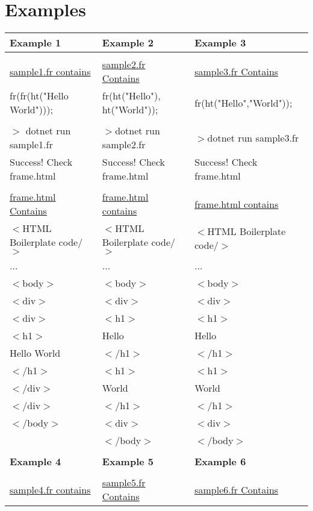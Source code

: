 \documentclass{article}
\newcommand\q[1][.7cm]{\hspace*{#1}}
\begin{document}
\section{Examples}
\begin{center}
\begin{tabular}{l|l|l} 

\textbf{Example 1} & \textbf{Example 2} & \textbf{Example 3}\\\hline
 & & \\
{\underline{sample1.fr contains}} & {\underline{sample2.fr Contains}} & {\underline{sample3.fr Contains}}\\

fr(fr(ht("Hello World"))); & fr(ht("Hello"), ht("World")); & fr(ht("Hello","World"));\\
 & & \\
$>$ dotnet run sample1.fr & $>$dotnet run sample2.fr & $>$dotnet run sample3.fr\\
Success! Check frame.html & Success! Check frame.html & Success! Check frame.html\\
 & & \\
\underline{frame.html Contains} & \underline{frame.html contains} & \underline{frame.html contains}\\
$<$HTML Boilerplate code/$>$ & $<$HTML Boilerplate code/$>$ & $<$HTML Boilerplate code/$>$\\
... & ... & ...\\
$<$body$>$ & $<$body$>$ & $<$body$>$\\
\q$<$div$>$ & \q$<$div$>$ & \q$<$div$>$\\
\q\q$<$div$>$ & \q\q$<$h1$>$ & \q\q$<$h1$>$\\
\q\q\q$<$h1$>$ & \q\q\q Hello & \q\q\q Hello\\
\q\q\q\q Hello World & \q\q$<$/h1$>$ & \q\q$<$/h1$>$\\
\q\q\q$<$/h1$>$ & \q\q$<$h1$>$ & \q\q$<$h1$>$\\
\q\q$<$/div$>$ & \q\q\q World & \q\q\q World\\
\q$<$/div$>$ & \q\q$<$/h1$>$ & \q\q$<$/h1$>$\\
$<$/body$>$ & \q$<$div$>$ & \q$<$div$>$\\
& $<$/body$>$ & $<$/body$>$\\
& &\\
\textbf{Example 4} & \textbf{Example 5} & \textbf{Example 6}\\\hline
 & & \\
{\underline{sample4.fr contains}} & {\underline{sample5.fr Contains}} & {\underline{sample6.fr Contains}}\\


\end{tabular}
\end{center}
\end{document}
